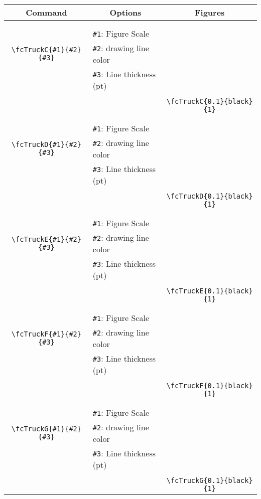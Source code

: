 \documentclass[x11names]{article}
\begin{document}
\begin{table}[H]\centering\begin{tabular}{|c|l|c|}\hline {\bf Command}& \multicolumn{1}{c|}{{\bf Options}} & {\bf Figures}\\  \hline	&&\multirow{5}{*}{\fcTruckC{0.1}{black}{1}}\\	&&\\	&\verb|#1|: Figure Scale &\\	\verb|\fcTruckC{#1}{#2}{#3}|&	\verb|#2|: drawing line color &\\	&\verb|#3|: Line thickness (pt) &\\ &&\\&&	\verb|\fcTruckC{0.1}{black}{1}|\\\hline 	
	&&\multirow{5}{*}{\fcTruckD{0.1}{black}{1}}\\	&&\\	&\verb|#1|: Figure Scale &\\	\verb|\fcTruckD{#1}{#2}{#3}|&	\verb|#2|: drawing line color &\\	&\verb|#3|: Line thickness (pt) &\\ &&\\&&	\verb|\fcTruckD{0.1}{black}{1}|\\\hline 	
	&&\multirow{5}{*}{\fcTruckE{0.1}{black}{1}}\\	&&\\	&\verb|#1|: Figure Scale &\\	\verb|\fcTruckE{#1}{#2}{#3}|&	\verb|#2|: drawing line color &\\	&\verb|#3|: Line thickness (pt) &\\ &&\\&&	\verb|\fcTruckE{0.1}{black}{1}|\\\hline 	
	&&\multirow{5}{*}{\fcTruckF{0.1}{black}{1}}\\	&&\\	&\verb|#1|: Figure Scale &\\	\verb|\fcTruckF{#1}{#2}{#3}|&	\verb|#2|: drawing line color &\\	&\verb|#3|: Line thickness (pt) &\\ &&\\&&	\verb|\fcTruckF{0.1}{black}{1}|\\\hline 	
	&&\multirow{5}{*}{\fcTruckG{0.1}{black}{1}}\\	&&\\	&\verb|#1|: Figure Scale &\\	\verb|\fcTruckG{#1}{#2}{#3}|&	\verb|#2|: drawing line color &\\	&\verb|#3|: Line thickness (pt) &\\ &&\\&&	\verb|\fcTruckG{0.1}{black}{1}|\\\hline 	

\end{tabular}
\end{table}
\end{document}
